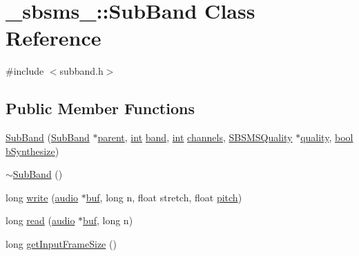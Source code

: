 \hypertarget{class__sbsms___1_1_sub_band}{}\section{\+\_\+sbsms\+\_\+\+:\+:Sub\+Band Class Reference}
\label{class__sbsms___1_1_sub_band}


{\ttfamily \#include $<$subband.\+h$>$}

\subsection*{Public Member Functions}
\begin{DoxyCompactItemize}
\item 
\hyperlink{class__sbsms___1_1_sub_band_a22ede76c6bc6b5daccb36bb68a94bc3e}{Sub\+Band} (\hyperlink{class__sbsms___1_1_sub_band}{Sub\+Band} $\ast$\hyperlink{class__sbsms___1_1_sub_band_a28e9b3ada3b1aa9a7d9b938de935568a}{parent}, \hyperlink{xmltok_8h_a5a0d4a5641ce434f1d23533f2b2e6653}{int} \hyperlink{class__sbsms___1_1_sub_band_a865ef147bdcfecee221ae3eb84aa54d2}{band}, \hyperlink{xmltok_8h_a5a0d4a5641ce434f1d23533f2b2e6653}{int} \hyperlink{class__sbsms___1_1_sub_band_a696155e930117037f0cab10fe5368c37}{channels}, \hyperlink{class__sbsms___1_1_s_b_s_m_s_quality}{S\+B\+S\+M\+S\+Quality} $\ast$\hyperlink{class__sbsms___1_1_sub_band_ad9c4865b8b6c0e40f6936f057bc811b7}{quality}, \hyperlink{mac_2config_2i386_2lib-src_2libsoxr_2soxr-config_8h_abb452686968e48b67397da5f97445f5b}{bool} \hyperlink{class__sbsms___1_1_sub_band_aed18bd90e1aa01d4b744ad43e3d52563}{b\+Synthesize})
\item 
\hyperlink{class__sbsms___1_1_sub_band_a6dd08da29f6a9817737f233b045b5ac6}{$\sim$\+Sub\+Band} ()
\item 
long \hyperlink{class__sbsms___1_1_sub_band_ad3e97167c024b1087b63430daffe19ec}{write} (\hyperlink{namespace__sbsms___a11786cc5bd221ff534972ae350477324}{audio} $\ast$\hyperlink{xlstr_8c_a781718f5b53a876fe91c424c4607fa8f}{buf}, long n, float stretch, float \hyperlink{seqread_8c_a7f083f7b76ea4d09b2820211a2b0d04e}{pitch})
\item 
long \hyperlink{class__sbsms___1_1_sub_band_ab3d36a0e3fda3358f021a53ad60c6d77}{read} (\hyperlink{namespace__sbsms___a11786cc5bd221ff534972ae350477324}{audio} $\ast$\hyperlink{xlstr_8c_a781718f5b53a876fe91c424c4607fa8f}{buf}, long n)
\item 
long \hyperlink{class__sbsms___1_1_sub_band_a3c43487da46e4d61a071457fee2a3ff2}{get\+Input\+Frame\+Size} ()

\end{DoxyCompactItemize}

